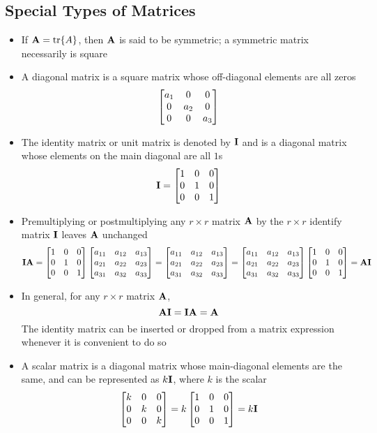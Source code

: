 \subsection{Special Types of Matrices}
\begin{itemize}
\item If $\mathbf{A} = \tr{A}$, then $\mathbf{A}$ is said to be symmetric; a symmetric matrix necessarily is square
\item A diagonal matrix is a square matrix whose off-diagonal elements are all zeros 
$$ \begin{bmatrix} a_1 & 0 & 0 \\ 0 & a_2 & 0 \\ 0 & 0 & a_3 \end{bmatrix} $$ 
\item The identity matrix or unit matrix is denoted by $\mathbf{I}$ and is a diagonal matrix whose elements on the main diagonal are all $1$s 
$$ \mathbf{I} = \begin{bmatrix} 1 & 0 & 0 \\ 0 & 1 & 0 \\ 0 & 0 & 1 \end{bmatrix} $$ 
\item Premultiplying or postmultiplying any $r \times r$ matrix $\mathbf{A}$ by the $r \times r$ identify matrix $\mathbf{I}$ leaves $\mathbf{A}$ unchanged 
$$ \mathbf{IA} = \begin{bmatrix} 1 & 0 & 0 \\ 0 & 1 & 0 \\ 0 & 0 & 1 \end{bmatrix} \begin{bmatrix} a_{11} & a_{12} & a_{13} \\ a_{21} & a_{22} & a_{23} \\ a_{31} & a_{32} & a_{33} \end{bmatrix} = \begin{bmatrix} a_{11} & a_{12} & a_{13} \\ a_{21} & a_{22} & a_{23} \\ a_{31} & a_{32} & a_{33} \end{bmatrix} = \begin{bmatrix} a_{11} & a_{12} & a_{13} \\ a_{21} & a_{22} & a_{23} \\ a_{31} & a_{32} & a_{33} \end{bmatrix} \begin{bmatrix} 1 & 0 & 0 \\ 0 & 1 & 0 \\ 0 & 0 & 1 \end{bmatrix} = \mathbf{AI} $$ 
\item In general, for any $r \times r$ matrix $\mathbf{A}$, $$ \mathbf{AI} = \mathbf{IA} = \mathbf{A} $$ The identity matrix can be inserted or dropped from a matrix expression whenever it is convenient to do so
\item A scalar matrix is a diagonal matrix whose main-diagonal elements are the same, and can be represented as $k\mathbf{I}$, where $k$ is the scalar 
$$ \begin{bmatrix} k & 0 & 0 \\ 0 & k & 0 \\ 0 & 0 & k  \end{bmatrix} = k\begin{bmatrix} 1 & 0 & 0 \\ 0 & 1 & 0 \\ 0 & 0 & 1 \end{bmatrix} = k\mathbf{I} $$

\end{itemize}
